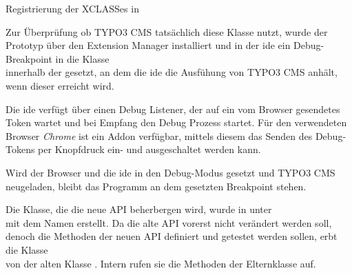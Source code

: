 \begin{listing}[H]
\caption{Registrierung der XCLASSes in }
\label{lst:xclassDatabaseAPI}
\end{listing}

Zur Überprüfung ob TYPO3 CMS tatsächlich diese Klasse nutzt, wurde der Prototyp über den Extension Manager installiert und in der \gls{ide} ein Debug-Breakpoint in die Klasse\\  innerhalb der  gesetzt, an dem die \gls{ide} die Ausfühung von TYPO3 CMS anhält, wenn dieser erreicht wird.

Die \gls{ide} verfügt über einen Debug Listener, der auf ein vom Browser gesendetes Token wartet und bei Empfang den Debug Prozess startet. Für den verwendeten Browser \textit{Chrome} ist ein Addon verfügbar, mittels diesem das Senden des Debug-Tokens per Knopfdruck ein- und ausgeschaltet werden kann.

Wird der Browser und die \gls{ide} in den Debug-Modus gesetzt und TYPO3 CMS neugeladen, bleibt das Programm an dem gesetzten Breakpoint stehen.

Die Klasse, die die neue API beherbergen wird, wurde in unter\\  mit dem Namen  erstellt. Da die alte API vorerst nicht verändert werden soll, denoch die Methoden der neuen API definiert und getestet werden sollen, erbt die Klasse\\ \phpinline{\Konafets\DoctrineDbal\Persistence\Doctrine\DatabaseConnection} von der alten Klasse \phpinline{\Konafets\DoctrineDbal\Persistence\Legacy\DatabaseConnection}.
Intern rufen sie die Methoden der Elternklasse auf.

